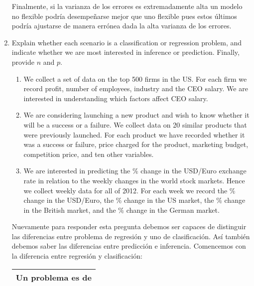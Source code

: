 \documentclass[a4paper,11pt]{article}
\begin{document}
\begin{enumerate}
{\begin{shaded}
            Finalmente, si la varianza de los errores es extremadamente alta un
            modelo no flexible podría desempeñarse mejor que uno flexible pues
            estos últimos podría ajustarse de manera errónea dada la alta
            varianza de los errores.
        \end{shaded}
}
        \item Explain whether each scenario is a classiﬁcation or regression
        problem, and indicate whether we are most interested in inference or
        prediction. Finally, provide $n$ and $p$.
        \begin{enumerate}
            \item We collect a set of data on the top 500 ﬁrms in the US. For
            each ﬁrm we record proﬁt, number of employees, industry and the CEO
            salary. We are interested in understanding which factors affect CEO
            salary.
            \item We are considering launching a new product and wish to know
            whether it will be a success or a failure. We collect data on 20
            similar products that were previously launched. For each product we
            have recorded whether it was a success or failure, price charged for
            the product, marketing budget, competition price, and ten other
            variables.
            \item We are interested in predicting the \% change in the USD/Euro
            exchange rate in relation to the weekly changes in the world stock
            markets. Hence we collect weekly data for all of 2012. For each week
            we record the \% change in the USD/Euro, the \% change in the US
            market, the \% change in the British market, and the \% change in
            the German market.
        \end{enumerate}
{\sl
        \begin{shaded}
        Nuevamente para responder esta pregunta debemos ser capaces de
        distinguir las diferencias entre problema de regresión y uno de
        clasificación. Así también debemos saber las diferencias entre
        predicción e inferencia. Comencemos con la diferencia entre regresión y
        clasificación:
        \begin{table}[H]
            \centering
            \begin{tabular}{|cc|}
                \hline
                \multicolumn{2}{|c|}{Un problema es de} \\ \hline

\end{tabular}
\end{table}
\end{shaded}}
\end{enumerate}
\end{document}
